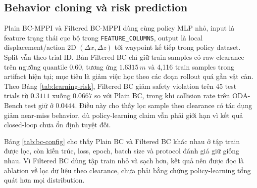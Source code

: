 \documentclass[10pt,letterpaper,twocolumn]{article}
\newcommand{\code}[1]{\texttt{#1}}
\begin{document}
\subsection{Behavior cloning và risk prediction}
Plain BC-MPPI và Filtered BC-MPPI dùng cùng policy MLP nhỏ, input là feature trạng thái cục bộ trong \code{FEATURE\_COLUMNS}, output là local displacement/action 2D \((\Delta x,\Delta z)\) tới waypoint kế tiếp trong policy dataset. Split vẫn theo trial ID. Bản Filtered BC chỉ giữ train samples có raw clearance trên ngưỡng quantile \(0.60\), tương ứng \(1.6315\,m\) và 4,116 train samples trong artifact hiện tại; mục tiêu là giảm việc học theo các đoạn rollout quá gần vật cản. Theo Bảng \ref{tab:learning-risk}, Filtered BC giảm safety violation trên 45 test trials từ \(0.3111\) xuống \(0.0667\) so với Plain BC, trong khi collision rate trên ODA-Bench test giữ ở \(0.0444\). Điều này cho thấy lọc sample theo clearance có tác dụng giảm near-miss behavior, dù policy-learning claim vẫn phải giới hạn vì kết quả closed-loop chưa ổn định tuyệt đối.

\begin{table}[!t]
\centering
\footnotesize
\caption{Cấu hình Plain BC-MPPI và Filtered BC-MPPI.}
\label{tab:bc-config}
\end{table}

Bảng \ref{tab:bc-config} cho thấy Plain BC và Filtered BC khác nhau ở tập train được lọc, còn kiến trúc, loss, epoch, batch size và protocol đánh giá giữ giống nhau. Vì Filtered BC dùng tập train nhỏ và sạch hơn, kết quả nên được đọc là ablation về lọc dữ liệu theo clearance, chưa phải bằng chứng policy-learning tổng quát hơn mọi distribution.
\end{document}
